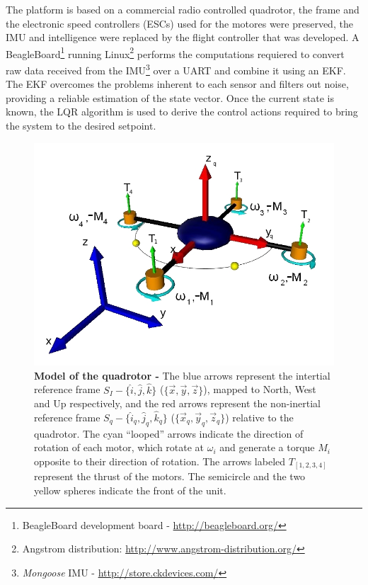 \documentclass[conference]{IEEEtran}
\begin{document}
The platform is based on a commercial radio controlled quadrotor, the frame and the electronic speed controllers (ESCs) used for the motores were preserved, the IMU and intelligence were replaced by the flight controller that was developed. A BeagleBoard\footnote{BeagleBoard development board - \url{http://beagleboard.org/}} running Linux\footnote{Angstrom distribution: \url{http://www.angstrom-distribution.org/}} performs the computations requiered to convert raw data received from the IMU\footnote{\textit{Mongoose} IMU - \url{http://store.ckdevices.com/}} over a UART and combine it using an EKF. The EKF overcomes the problems inherent to each sensor and filters out noise, providing a reliable estimation of the state vector. Once the current state is known, the LQR algorithm\cite{bib:lqrnotes}\cite{bib:lqr-discreto} is used to derive the control actions required to bring the system to the desired setpoint.

\begin{figure}
	\centering
	\includegraphics[width=.7\columnwidth]{./pics_paper/quad_coord.jpg}
	\caption{\textbf{Model of the quadrotor -} The blue arrows represent the intertial reference frame $S_I - \lbrace \hat{i},\hat{j},\hat{k}\rbrace$ ($\lbrace \vec{x},\vec{y},\vec{z}\rbrace$), mapped to  North, West and Up respectively, and the red arrows represent the non-inertial reference frame $S_q - \lbrace \hat{i}_q,\hat{j}_q,\hat{k}_q\rbrace$ ($\lbrace \vec{x}_q,\vec{y}_q,\vec{z}_q\rbrace$) relative to the quadrotor. The cyan ``looped'' arrows indicate the direction of rotation of each motor, which rotate at $\omega_i$ and generate a torque $M_i$ opposite to their direction of rotation. The arrows labeled $T_{[1,2,3,4]}$ represent the thrust of the motors. The semicircle and the two yellow spheres indicate the front of the unit.}
	\label{fig:quad}
\end{figure}
\end{document}
